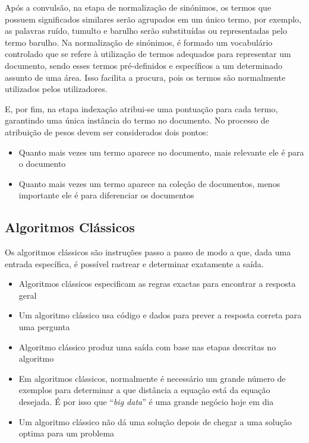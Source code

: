 \documentclass[a4paper,10pt]{article}
\begin{document}
Após a convulsão, na etapa de normalização de sinónimos, os termos que possuem significados similares serão agrupados em um único termo, por exemplo, as palavras ruído, tumulto e barulho serão substituídas ou representadas pelo termo barulho.
Na normalização de sinónimos, é formado um vocabulário controlado que se refere à utilização de termos adequados para representar um documento, sendo esses termos pré-definidos e específicos a um determinado assunto de uma área.
Isso facilita a procura, pois os termos são normalmente utilizados pelos utilizadores.

E, por fim, na etapa indexação atribui-se uma pontuação para cada termo, garantindo uma única instância do termo no documento.
No processo de atribuição de pesos devem ser considerados dois pontos:
\begin{itemize}
    \item Quanto mais vezes um termo aparece no documento, mais relevante ele é para o documento
    \item Quanto mais vezes um termo aparece na coleção de documentos, menos importante ele é para diferenciar os documentos
\end{itemize}

\subsection{Algoritmos Clássicos}

Os algoritmos clássicos são instruções passo a passo de modo a que, dada uma entrada específica, é possível rastrear e determinar exatamente a saída.
\begin{itemize}
    \item Algoritmos clássicos especificam as regras exactas para encontrar a resposta geral
    \item Um algoritmo clássico usa código e dados para prever a resposta correta para uma pergunta
    \item Algoritmo clássico produz uma saída com base nas etapas descritas no algoritmo
    \item Em algoritmos clássicos, normalmente é necessário um grande número de exemplos para determinar a que distância a equação está da equação desejada. É por isso que ``\textit{big data}'' é uma grande negócio hoje em dia
    \item Um algoritmo clássico não dá uma solução depois de chegar a uma solução optima para um problema
\end{itemize}
\end{document}
